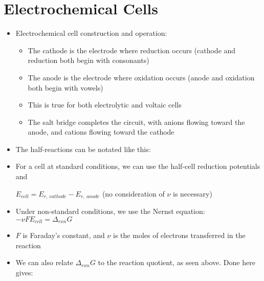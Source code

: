 \documentclass[12pt, openany, letterpaper]{memoir}
\begin{document}
\section{Electrochemical Cells}
\begin{itemize}
	\item Electrochemical cell construction and operation:
	\begin{itemize}
		\item The cathode is the electrode where reduction occurs (cathode and reduction both begin with consonants)
		\item The anode is the electrode where oxidation occurs (anode and oxidation both begin with vowels)
		\item This is true for both electrolytic and voltaic cells
		\item The salt bridge completes the circuit, with anions flowing toward the anode, and cations flowing toward the cathode
	\end{itemize}
	\item The half-reactions can be notated like this: 
	\item For a cell at standard conditions, we can use the half-cell reduction potentials and
	
	$E_{cell}=E_{r,~cathode}-E_{r,~anode}$ (no consideration of $\nu$ is necessary)
	\item Under non-standard conditions, we use the Nernst equation: $-\nu FE_{cell}=\Delta_{rxn}G$
	\item $F$ is Faraday's constant, and $\nu$ is the moles of electrons transferred in the reaction
	\item We can also relate $\Delta_{rxn}G$ to the reaction quotient, as seen above. Done here gives:
	

\end{itemize}
\end{document}
